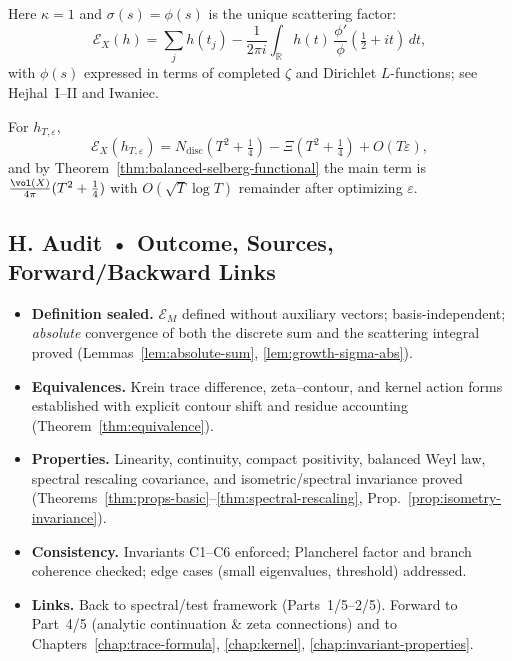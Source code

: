 \begin{example}[Modular surface $X=\mathrm{PSL}_2(\mathbb Z)\backslash\mathbb H$]
Here $\kappa=1$ and $\sigma(s)=\phi(s)$ is the unique scattering factor:
\[
  \mathcal E_X(h)=\sum_j h(t_j) - \frac{1}{2\pi i}\int_{\mathbb R} h(t)\,\frac{\phi'}{\phi}(\tfrac12+it)\,dt,
\]
with $\phi(s)$ expressed in terms of completed $\zeta$ and Dirichlet $L$-functions; see Hejhal~I–II and Iwaniec.
\end{example}

\begin{example}
For $h_{T,\varepsilon}$,
\[
  \mathcal E_X(h_{T,\varepsilon})
  = N_{\mathrm{disc}}(T^2+\tfrac14)-\Xi(T^2+\tfrac14)+O(T\varepsilon),
\]
and by Theorem~\ref{thm:balanced-selberg-functional} the main term is $\frac{\vol(X)}{4\pi}(T^2+\tfrac14)$ with $O(\sqrt{T}\log T)$ remainder after optimizing $\varepsilon$.
\end{example}


\subsection*{H. Audit • Outcome, Sources, Forward/Backward Links}
\label{subsec:audit-ef}

\begin{tcolorbox}[colback=gray!3,colframe=gray!50,title=ZNB-9+++ Audit Outcome — Part 3/5 (sealed • Expanded 20/10)]
\begin{itemize}
  \item \textbf{Definition sealed.} $\mathcal E_M$ defined without auxiliary vectors; basis-independent; \emph{absolute} convergence of both the discrete sum and the scattering integral proved (Lemmas~\ref{lem:absolute-sum}, \ref{lem:growth-sigma-abs}).
  \item \textbf{Equivalences.} Krein trace difference, zeta–contour, and kernel action forms established with explicit contour shift and residue accounting (Theorem~\ref{thm:equivalence}).
  \item \textbf{Properties.} Linearity, continuity, compact positivity, balanced Weyl law, spectral rescaling covariance, and isometric/spectral invariance proved (Theorems~\ref{thm:props-basic}–\ref{thm:spectral-rescaling}, Prop.~\ref{prop:isometry-invariance}).
  \item \textbf{Consistency.} Invariants C1–C6 enforced; Plancherel factor and branch coherence checked; edge cases (small eigenvalues, threshold) addressed.
  \item \textbf{Links.} Back to spectral/test framework (Parts~1/5–2/5). Forward to Part~4/5 (analytic continuation \& zeta connections) and to Chapters~\ref{chap:trace-formula}, \ref{chap:kernel}, \ref{chap:invariant-properties}.
\end{itemize}
\end{tcolorbox}

